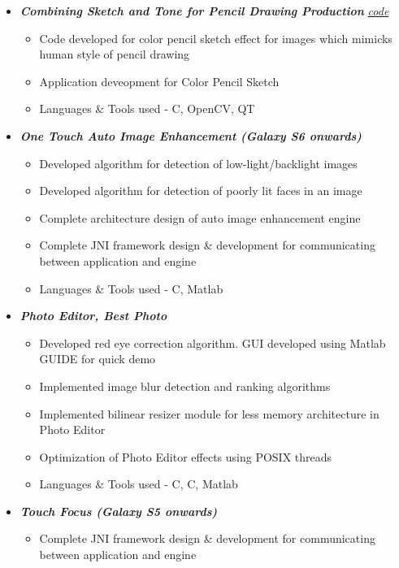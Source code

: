 \documentclass[letterpaper,11pt]{article}
\def\CC{{C\nolinebreak[4]\hspace{-.05em}\raisebox{.4ex}{\tiny\bf ++}}}
\newcommand{\resitem}[1]{\item #1 \vspace{-2pt}}
\begin{document}
\begin{itemize}
\begin{itemize}
{					\faGithub \hspace{1mm} \href{https://github.com/nrupatunga/GIST-global-Image-Descripor}{\emph{code}}}
				\begin{itemize}
						\resitem{Developed code for extracting GIST descriptor for images}
						\resitem{Demonstrated how GIST descriptor can be used for detection of duplicate images in Gallery}
						\resitem{Languages \& Tools used - \CC, OpenCV, MATLAB}
				\end{itemize}
				\vspace{2.5mm}
				\resitem[]{\faCircleO \hspace{1mm}\textbf{\emph{Combining Sketch and Tone for Pencil Drawing Production}}\hspace{1mm}
					\faGithub \hspace{1mm} \href{https://github.com/nrupatunga/Color-Pencil-Sketch}{\emph{code}}}
				\begin{itemize}
						\resitem{Code developed for color pencil sketch effect for images which mimicks human style of pencil drawing}
						\resitem{Application deveopment for Color Pencil Sketch}
						\resitem{Languages \& Tools used - \CC, OpenCV, QT}
				\end{itemize}
				\vspace{15mm}
				\resitem[]{\faCircleO \hspace{1mm}\textbf{\emph{One Touch Auto Image Enhancement (Galaxy S6 onwards)}}}
				\begin{itemize}
						\resitem{Developed algorithm for detection of low-light/backlight images}
						\resitem{Developed algorithm for detection of poorly lit faces in an image}
						\resitem{Complete architecture design of auto image enhancement engine }
						\resitem{Complete JNI framework design \& development for communicating between application and engine}
						\resitem{Languages \& Tools used - C, Matlab}
				\end{itemize}
				\vspace{2.5mm}
				\resitem[]{\faCircleO \hspace{1mm}\textbf{\emph{Photo Editor, Best Photo}}}
				\begin{itemize}
						\resitem{Developed red eye correction algorithm. GUI developed using Matlab GUIDE for quick demo }
						\resitem{Implemented image blur detection and ranking algorithms}
						\resitem{Implemented bilinear resizer module for less memory architecture in Photo Editor}
						\resitem{Optimization of Photo Editor effects using POSIX threads}
						\resitem{Languages \& Tools used - C, \CC, Matlab}
				\end{itemize}
				\vspace{2.5mm}
				\resitem[]{\faCircleO \hspace{1mm}\textbf{\emph{Touch Focus (Galaxy S5 onwards)}}}
				\begin{itemize}
						\resitem{Complete JNI framework design \& development for communicating between application and engine}
				\end{itemize}
		\end{itemize}

\end{itemize}
\end{document}
